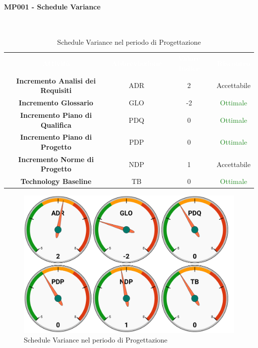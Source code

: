 \paragraph{MP001 - Schedule Variance}\mbox{}\\[0,3cm]
\begin{table}[H]
    \centering
    \begin{tabular}{cccc}
        \rowcolor{greySWEight}
        \textcolor{white}{\textbf{Attività}} & 
        \textcolor{white}{\textbf{Abbreviazione}} &
        \textcolor{white}{\textbf{Valore Indice}}&
        \textcolor{white}{\textbf{Riscontro}}\\
		\textbf{Incremento Analisi dei Requisiti} & ADR & 2 & \textcolor{YellowOrange}{Accettabile}\\
		\textbf{Incremento Glossario} & GLO & -2 & \textcolor{ForestGreen}{Ottimale} \\
		\textbf{Incremento Piano di Qualifica} & PDQ & 0 & \textcolor{ForestGreen}{Ottimale} \\
		\textbf{Incremento Piano di Progetto} & PDP & 0 & \textcolor{ForestGreen}{Ottimale} \\
		\textbf{Incremento Norme di Progetto} & NDP & 1 & \textcolor{YellowOrange}{Accettabile} \\
		\textbf{Technology Baseline} & TB & 0 & \textcolor{ForestGreen}{Ottimale} \\

    \end{tabular}
    \caption{Schedule Variance nel periodo di Progettazione}
\end{table}
\begin{figure}[H]
    \centering
	\includegraphics[width=1\linewidth]{sez/App_Esito/Progettazione/graph/PR_SV.pdf}
	\caption{Schedule Variance nel periodo di Progettazione}
\end{figure}

